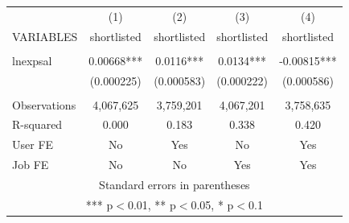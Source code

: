 



\begin{tabular}{lcccc} \hline
 & (1) & (2) & (3) & (4) \\
VARIABLES & shortlisted & shortlisted & shortlisted & shortlisted \\ \hline
 &  &  &  &  \\
lnexpsal & 0.00668*** & 0.0116*** & 0.0134*** & -0.00815*** \\
 & (0.000225) & (0.000583) & (0.000222) & (0.000586) \\
 &  &  &  &  \\
Observations & 4,067,625 & 3,759,201 & 4,067,201 & 3,758,635 \\
R-squared & 0.000 & 0.183 & 0.338 & 0.420 \\
User FE & No & Yes & No & Yes \\
 Job FE & No & No & Yes & Yes \\ \hline
\multicolumn{5}{c}{ Standard errors in parentheses} \\
\multicolumn{5}{c}{ *** p$<$0.01, ** p$<$0.05, * p$<$0.1} \\
\end{tabular}


